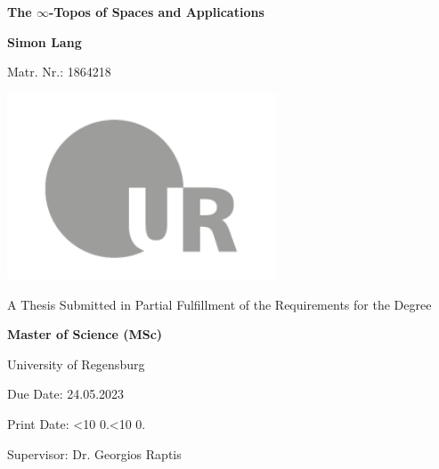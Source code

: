 \documentclass[a4paper,10pt]{scrreprt}
\newcommand{\leadingzero}[1]{\ifnum #1<10 0\the#1\else\the#1\fi}
\newcommand{\todayA}{\leadingzero{\day}.\leadingzero{\month}.\the\year}
\begin{document}
\begin{titlepage}
    \begin{center}
        \vspace*{1cm}
 
        \Huge
        \textbf{The $\infty$-Topos of Spaces and Applications}
 
        \vspace{0.5cm}
        \LARGE
 
        \vspace{1.5cm}
 
        \textbf{Simon Lang}

        \large 
        Matr. Nr.: 1864218
 		
 		\vfill
         \includegraphics[width=0.6\textwidth]{ur-logo-bildmarke-grau.png}
 
        \vfill
        \normalsize
        A Thesis Submitted in Partial Fulfillment of the Requirements for the Degree

        \LARGE
        \textbf{Master of Science (MSc)}

        \vspace{0.8cm}
 
        \Large
        University of Regensburg

        Due Date: 24.05.2023

        Print Date: \todayA

        Supervisor: Dr. Georgios Raptis
 
    \end{center}
\end{titlepage}
\end{document}
